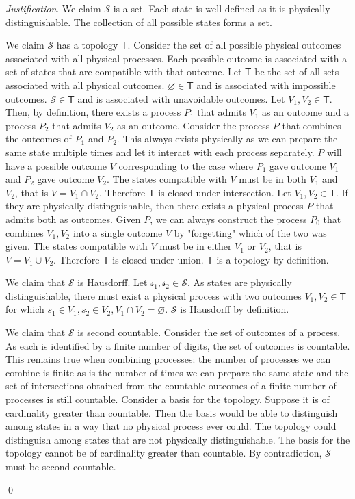 \documentclass[aps,pra,10pt,twocolumn,floatfix,nofootinbib]{revtex4-1}
\numberwithin{equation}{section}
\theoremstyle{definition}
\newenvironment{justification}{\emph{Justification}.}{\qed}
\begin{document}
\begin{justification}
We claim $\mathcal{S}$ is a set. Each state is well defined as it is physically distinguishable. The collection of all possible states forms a set.

We claim $\mathcal{S}$ has a topology $\mathsf{T}$. Consider the set of all possible physical outcomes associated with all physical processes. Each possible outcome is associated with a set of states that are compatible with that outcome. Let $\mathsf{T}$ be the set of all sets associated with all physical outcomes. $\varnothing \in \mathsf{T}$ and is associated with impossible outcomes. $\mathcal{S} \in \mathsf{T}$ and is associated with unavoidable outcomes. Let $V_1, V_2 \in \mathsf{T}$. Then, by definition, there exists a process $P_1$ that admits $V_1$ as an outcome and a process $P_2$ that admits $V_2$ as an outcome. Consider the process $P$ that combines the outcomes of $P_1$ and $P_2$. This always exists physically as we can prepare the same state multiple times and let it interact with each process separately. $P$ will have a possible outcome $V$ corresponding to the case where $P_1$ gave outcome $V_1$ and $P_2$ gave outcome $V_2$. The states compatible with $V$ must be in both $V_1$ and $V_2$, that is $V = V_1 \cap V_2$. Therefore $\mathsf{T}$ is closed under intersection. Let $V_1, V_2 \in \mathsf{T}$. If they are physically distinguishable, then there exists a physical process $P$ that admits both as outcomes. Given $P$, we can always construct the process $P_0$ that combines $V_1, V_2$ into a single outcome $V$ by "forgetting" which of the two was given. The states compatible with $V$ must be in either $V_1$ or $V_2$, that is $V = V_1 \cup V_2$. Therefore $\mathsf{T}$ is closed under union. $\mathsf{T}$ is a topology by definition.

We claim that $\mathcal{S}$ is Hausdorff. Let $\mathcal{s_1}, \mathcal{s_2} \in \mathcal{S}$. As states are physically distinguishable, there must exist a physical process with two outcomes $V_1, V_2 \in \mathsf{T}$ for which $s_1 \in V_1, s_2 \in V_2, V_1 \cap V_2 = \varnothing$. $\mathcal{S}$ is Hausdorff by definition.

We claim that $\mathcal{S}$ is second countable. Consider the set of outcomes of a process. As each is identified by a finite number of digits, the set of outcomes is countable. This remains true when combining processes: the number of processes we can combine is finite as is the number of times we can prepare the same state and the set of intersections obtained from the countable outcomes of a finite number of processes is still countable. Consider a basis for the topology. Suppose it is of cardinality greater than countable. Then the basis would be able to distinguish among states in a way that no physical process ever could. The topology could distinguish among states that are not physically distinguishable. The basis for the topology cannot be of cardinality greater than countable. By contradiction, $\mathcal{S}$ must be second countable.

\end{justification}
\end{document}
